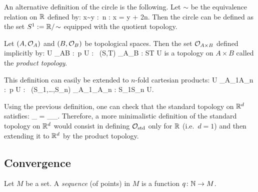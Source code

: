 An alternative definition of the circle is the following. Let $\sim$ be the equivalence relation on $\mathbb{R}$ defined by:
\bse
x\sim y :\eqv \exists \, n \in \Z : x = y + 2\pi n. 
\ese
Then the circle can be defined as the set $S^1:=\mathbb{R}/\!\sim$ equipped with the quotient topology.
\ee



\bd
Let $(A,\mathcal{O}_A)$ and $(B,\mathcal{O}_B)$ be topological spaces. Then the set $\mathcal{O}_{A\times B}$ defined implicitly by:
\bse
U \in \cO_{A\times B} :\eqv \forall \, p \in U : \exists \, (S,T) \in \cO_A\times \cO_B : S\times T \se U
\ese
is a topology on $A\times B$ called the \emph{product topology}.
\ed

\br
This definition can easily be extended to $n$-fold cartesian products:
\bse
U \in \cO_{A_1\times \cdots \times A_n} :\eqv \forall \, p \in U : \exists \, (S_1,\ldots,S_n) \in \cO_{A_1}\times \cdots \times \cO_{A_n} : S_1\times \cdots\times S_n \se U.
\ese
\er

\br
Using the previous definition, one can check that the standard topology on $\mathbb{R}^d$ satisfies:
\bse
\cO_ = \cO_{\underbrace{\scriptstyle \R\times\R\times\cdots\times\R}_}.
\ese
Therefore, a more minimalistic definition of the standard topology on $\mathbb{R}^d$ would consist in defining $\mathcal{O}_\mathrm{std}$ only for $\mathbb{R}$ (i.e.\ $d=1$) and then extending it to $\mathbb{R}^d$ by the product topology.
\er


\subsection{Convergence}

\bd
Let $M$ be a set. A \emph{sequence} (of points) in $M$ is a function $q \colon \mathbb{N} \to  M$.
\ed

